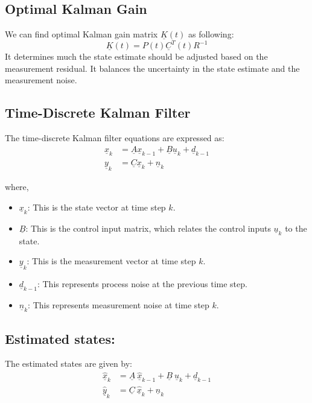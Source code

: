 \begin{appendices}
\subsection{Optimal Kalman Gain}
We can find optimal Kalman gain matrix $\underline{K}(t)$ as following:
\begin{equation}
	\underline{K}(t) = P(t) \underline{C}^T(t) R^{-1}  \label{eq:eq}
\end{equation}
It determines much the state estimate should be adjusted based on the measurement residual. It balances the uncertainty in the state estimate and the measurement noise.


\subsection{Time-Discrete Kalman Filter}
The time-discrete Kalman filter equations are expressed as:
\begin{equation}
	\begin{aligned}
		\underline{x}_{k} &= \underline{A} \underline{x}_{k-1} + \underline{B} \underline{u}_{k} + \underline{d}_{k-1} \\
		\underline{y}_{k} &= \underline{C} \underline{x}_{k} + \underline{n}_{k}  \label{eq:eq}
	\end{aligned}
\end{equation}

where, 
\begin{itemize}
	\item $\underline{x}_k$: This is the state vector at time step $k$.
	\item $\underline{B}$: This is the control input matrix, which relates the control inputs $\underline{u}_k$ to the state.
	\item $\underline{y}_k$: This is the measurement vector at time step $k$.
	\item $\underline{d}_{k-1}$: This represents process noise at the previous time step.
	\item $\underline{n}_k$: This represents measurement noise at time step $k$.
\end{itemize}


\subsection{Estimated states:}
The estimated states are given by:
\begin{equation}
	\begin{aligned}
		\underline{\hat{x}}_{k} &= \underline{A} \  \underline{\hat{x}}_{k-1} + \underline{B} \ \underline{u}_{k} + \underline{d}_{k-1} \\
		\underline{\hat{y}}_{k} &= \underline{C} \ \underline{\hat{x}}_{k} + \underline{n}_{k}  \label{eq:eq}
	\end{aligned}
\end{equation}



\end{appendices}
